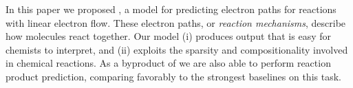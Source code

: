 
In this paper we proposed \ourModel, a model for predicting electron paths for reactions with linear electron flow.
These electron paths, or {\em reaction mechanisms}, describe how molecules react together. 
Our model (i) produces output that is easy for chemists to interpret, and (ii) exploits the sparsity and compositionality involved in chemical reactions.
As a byproduct of we are also able to perform reaction product prediction,
comparing favorably to the strongest baselines on this task. 
%
%
%
%
%

